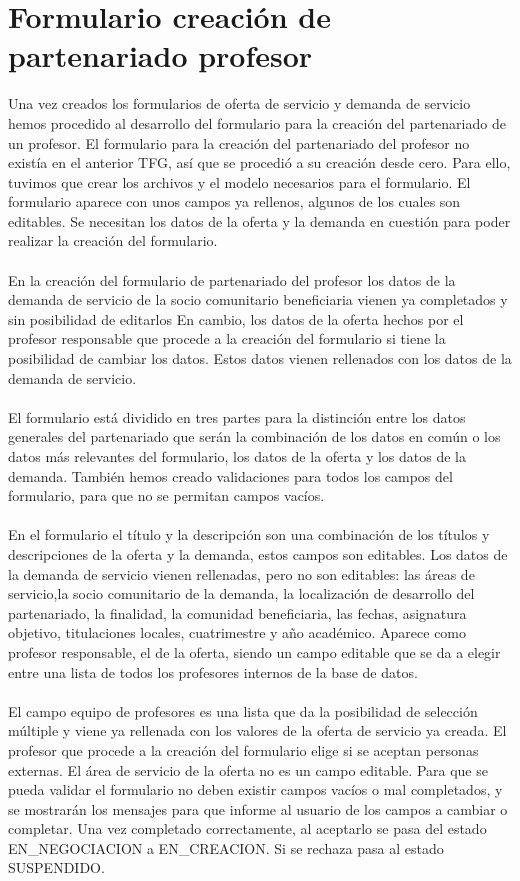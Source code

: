 \documentclass[11pt]{book}
\begin{document}
\section{Formulario creación de partenariado profesor}
Una vez creados los formularios de oferta de servicio y demanda de servicio hemos procedido al desarrollo del formulario para la creación del partenariado de un profesor.
El formulario para la creación del partenariado del profesor no existía en el anterior TFG, así que se procedió a su creación desde cero. Para ello, tuvimos que crear los archivos y el modelo necesarios para el formulario. El formulario aparece con unos campos ya rellenos, algunos de los cuales son editables. Se necesitan los datos de la oferta y la demanda en cuestión para poder realizar la creación del formulario.\\\\
En la creación del formulario de partenariado del profesor los datos de la demanda de servicio de la socio comunitario beneficiaria vienen ya completados y sin posibilidad de editarlos En cambio, los datos de la oferta hechos por el profesor responsable que procede a la creación del formulario si tiene la posibilidad de cambiar los datos. Estos datos vienen rellenados con los datos de la demanda de servicio.\\\\
El formulario está dividido en tres partes para la distinción entre los datos generales del partenariado que serán la combinación de los datos en común o los datos más relevantes del formulario, los datos de la oferta y los datos de la demanda. También hemos creado validaciones para todos los campos del formulario, para que no se permitan campos vacíos.\\\\
En el formulario el título y la descripción son una  combinación de los títulos y descripciones de la oferta y la demanda, estos campos son editables. Los datos de la demanda de servicio vienen rellenadas, pero no son editables:  las áreas de servicio,la socio comunitario de la demanda, la localización de desarrollo del partenariado, la finalidad, la comunidad beneficiaria, las fechas, asignatura objetivo, titulaciones locales, cuatrimestre y año académico. Aparece como profesor responsable, el de la oferta, siendo un campo editable que se da a elegir entre una lista de todos los profesores internos de la base de datos.\\\\
El campo equipo de profesores es una lista que da la posibilidad de selección múltiple y viene ya rellenada con los valores de la oferta de servicio ya creada. El profesor que procede a la creación del formulario elige si se aceptan personas externas. El área de servicio de la oferta no es un campo editable. Para que se pueda validar el formulario no deben existir campos vacíos o mal completados, y se mostrarán los mensajes para que informe al usuario de los campos a cambiar o completar. Una vez completado correctamente, al aceptarlo se pasa del estado EN\_NEGOCIACION a EN\_CREACION. Si se rechaza pasa al estado SUSPENDIDO.
\\\\
\end{document}
